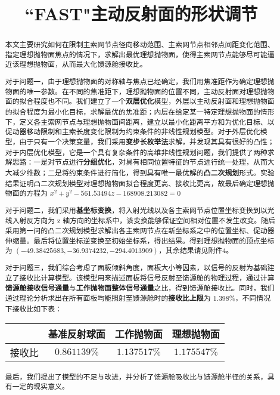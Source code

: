 \documentclass[withoutpreface,bwprint,fontset=macnew]{cumcmthesis} %
\title{``FAST"主动反射面的形状调节}
\begin{document}
	
	
	\maketitle
	\begin{abstract}
		本文主要研究如何在限制主索网节点径向移动范围、主索网节点相邻点间距变化范围、指定理想抛物面焦点的情况下，求解出最优理想抛物面，使得主索网节点能够尽可能逼近该理想抛物面，从而最大化馈源舱接收比。

		对于问题一，由于理想抛物面的对称轴与焦点已经确定，我们用焦准距作为确定理想抛物面的唯一参数。在不同的焦准距下，理想抛物面的位置不同，主动反射面对理想抛物面的拟合程度也不同。我们建立了一个\textbf{双层优化}模型，外层以主动反射面和理想抛物面的拟合程度为最小化目标，求解最优的焦准距；内层在给定某一特定理想抛物面的情形下，定义各主索网节点与理想抛物面间距离，建立以最小化距离平方和为优化目标、以促动器移动限制和主索长度变化限制为约束条件的非线性规划模型。对于外层优化模型，由于只有一个决策变量，我们采用\textbf{变步长枚举法}求解，并发现其具有很好的凸性；对于内层优化模型，它是一个具有复杂条件的高维非线性规划问题，我们提供了两种求解思路：一是对节点进行\textbf{分组优化}，对具有相同位置特征的节点进行统一处理，从而大大减少维数；二是将约束条件进行简化，得到具有唯一最优解的\textbf{凸二次规划}形式。实验结果证明凸二次规划模型对理想抛物面拟合程度更高、接收比更高，故最后确定理想抛物面的方程为
		$
		x^2 + y^2 -561.53494z - 168908.213082 = 0
		$
		
		对于问题二，我们采用\textbf{基坐标变换}，将入射光线以及各主索网节点位置坐标变换到以光线入射反方向为 z 轴方向的坐标系中，该变换能够保证空间相对位置不发生改变。随后采用第一问的凸二次规划模型求解出各主索网节点在新坐标系之中的位置坐标、促动器伸缩量。最后将位置坐标逆变换至初始坐标系，得出结果。得到理想抛物面的顶点坐标为 $(-49.38425683, -36.9374232, -294.4013909)$，其余结果请见附件4。

		对于问题三，我们综合考虑了面板倾斜角度，面板大小等因素，以信号的反射为基础建立了接收比计算模型。该模型用来描述面板将信号反射至馈源舱的物理过程，通过计算\textbf{馈源舱接收信号通量}与\textbf{工作抛物面整体信号通量}之比，得到馈源舱接收比。同时，我们通过理论分析求出在所有面板均能照射至馈源舱时的\textbf{接收比上限}为 $1.398\%$，不同情况下接收比如下表：
		\begin{table}[!htbp]
			\centering
			\begin{tabular}{cccc}
				\toprule[1.5pt]
				$ $ & 基准反射球面 & 工作抛物面 & 理想抛物面\\
				\midrule[1pt]
				接收比 & $0.861139\%$ & $1.137517\%$ & $1.175547\%$\\
				\bottomrule[1.5pt]
			\end{tabular}
		\end{table}

		最后，我们提出了模型的不足与改进，并分析了馈源舱吸收比与馈源舱半径的关系，具有一定的现实意义。
		
	\end{abstract}
\end{document}
